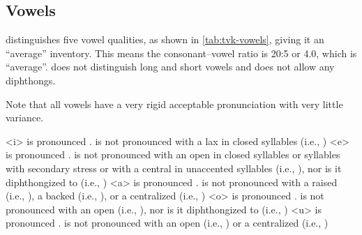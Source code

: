 \subsection{Vowels}
\label{subsec:tvk-vowels}


\langtvk{} distinguishes five vowel qualities, as shown in \autoref{tab:tvk-vowels}, giving it an \enquote{average} inventory.\autocite{wals-2} This means the consonant--vowel ratio is 20:5 or 4.0, which is \enquote{average}.\autocite{wals-3} \langtvk{} does not distinguish long and short vowels and does not allow any diphthongs.

Note that all \langtvk{} vowels have a very rigid acceptable pronunciation with very little variance.

	    is pronounced .  is not pronounced with a lax  in closed syllables (i.e., )
	    is pronounced .  is not pronounced with an open  in closed syllables or syllables with secondary stress or with a central  in unaccented syllables (i.e., ), nor is it diphthongized to  (i.e., )
	    is pronounced .  is not pronounced with a raised  (i.e., ), a backed  (i.e., ), or a centralized  (i.e., )
	    is pronounced .  is not pronounced with an open  (i.e., ), nor is it diphthongized to  (i.e., )
	    is pronounced .  is not pronounced with an open  (i.e., ) or a centralized  (i.e., )
\xe

